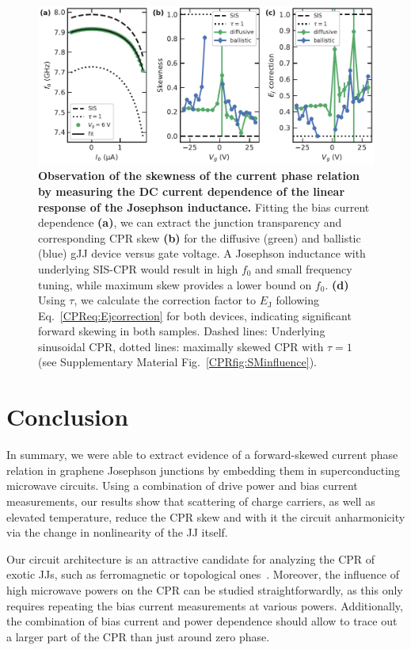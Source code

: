 \begin{figure}[t]
	\centering
	\includegraphics[width=\linewidth]{chapter-gJJ-CPR/figs/Figure4}
	\caption{
		\textbf{Observation of the skewness of the current phase relation by measuring the DC current dependence of the linear response of the Josephson inductance.}
		Fitting the bias current dependence \textbf{(a)}, we can extract the junction transparency and corresponding CPR skew \textbf{(b)} for the diffusive (green) and ballistic (blue) gJJ device versus gate voltage.
		A Josephson inductance with underlying SIS-CPR would result in high $f_0$ and small frequency tuning, while maximum skew provides a lower bound on $f_0$.
		\textbf{(d)} Using $\tau$, we calculate the correction factor to $E_\text{J}$ following Eq.~\ref{CPReq:Ejcorrection} for both devices, indicating significant forward skewing in both samples.
		Dashed lines: Underlying sinusoidal CPR, dotted lines: maximally skewed CPR with $\tau=1$ (see Supplementary Material Fig.~\ref{CPRfig:SMinfluence}).
	}
	\label{CPRfig:figure4}
\end{figure}

\section{Conclusion}

In summary, we were able to extract evidence of a forward-skewed current phase relation in graphene Josephson junctions by embedding them in superconducting microwave circuits.
%
Using a combination of drive power and bias current measurements, our results show that scattering of charge carriers, as well as elevated temperature, reduce the CPR skew and with it the circuit anharmonicity via the change in nonlinearity of the JJ itself.

Our circuit architecture is an attractive candidate for analyzing the CPR of exotic JJs, such as ferromagnetic or topological ones~\cite{golubovCurrentphaseRelationJosephson2004a,sochnikovNonsinusoidalCurrentPhaseRelationship2015,stoutimoreSecondHarmonicCurrentPhaseRelation2018,assoulineSpinOrbitInducedPhaseshift2019,muraniMicrowaveSignatureTopological2019}.
%
Moreover, the influence of high microwave powers on the CPR can be studied straightforwardly, as this only requires repeating the bias current measurements at various powers.
%
Additionally, the combination of bias current and power dependence should allow to trace out a larger part of the CPR than just around zero phase.

